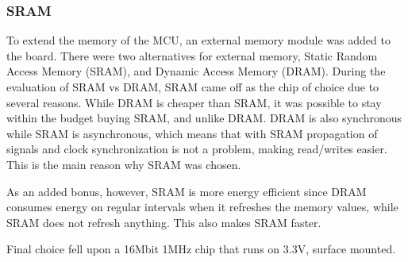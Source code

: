 
\subsubsection{SRAM}

To extend the memory of the MCU, an external memory module was added to the
board. There were two alternatives for external memory, Static Random Access
Memory (SRAM), and Dynamic Access Memory (DRAM). During the evaluation of SRAM
vs DRAM, SRAM came off as the chip of choice due to several reasons. While DRAM
is cheaper than SRAM, it was possible to stay within the budget buying SRAM, and
unlike DRAM. DRAM is also synchronous while SRAM is asynchronous, which means
that with SRAM propagation of signals and clock synchronization is not a
problem, making read/writes easier. This is the main reason why SRAM was chosen.

As an added bonus, however, SRAM is more energy efficient since DRAM consumes
energy on regular intervals when it refreshes the memory values, while SRAM does
not refresh anything. This also makes SRAM faster.

Final choice fell upon a 16Mbit 1MHz chip that runs on 3.3V, surface mounted.

